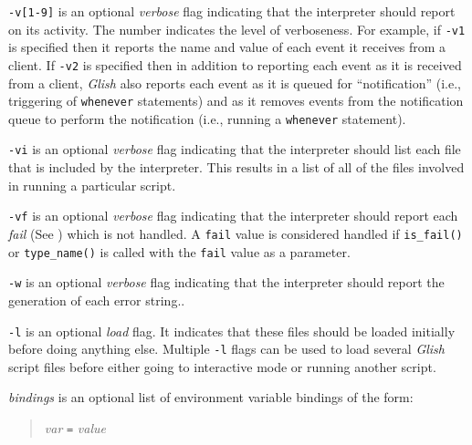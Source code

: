 \begin{sloppy}
\verb+-v[1-9]+ is an optional {\em verbose} flag indicating that the interpreter
should report on its activity.   The number indicates the
level of verboseness. For example, if {\tt -v1} is specified then it reports the
name and value of each event it receives from a client.  If {\tt -v2} is specified
then in addition to reporting each event as it is received from a client, {\em Glish}
also reports each event as it is queued for ``notification'' (i.e., triggering of {\tt whenever}
statements) and as it removes events from the notification queue to perform the
notification (i.e., running a {\tt whenever} statement).

\verb+-vi+ is an optional {\em verbose} flag indicating that the interpreter
should list each file that is included by the interpreter. This results in
a list of all of the files involved in running a particular script.

\verb+-vf+ is an optional {\em verbose} flag indicating that the interpreter
should report each {\em fail} (See ) which is not handled.
A {\tt fail} value is considered handled if {\tt is\_fail()} or {\tt type\_name()}
is called with the {\tt fail} value as a parameter.

\verb+-w+ is an optional {\em verbose} flag indicating that the interpreter
should report the generation of each error string..

{\tt -l} is an optional {\em load} flag. It indicates that these files should be
loaded initially before doing anything else. Multiple \verb+-l+ flags can be used
to load several {\em Glish} script files before either going to interactive mode or
running another script.

{\em bindings} is an optional list of environment variable bindings
of the form:
\begin{quote}
    {\em var} {\tt =} {\em value}
\end{quote}


\end{sloppy}
